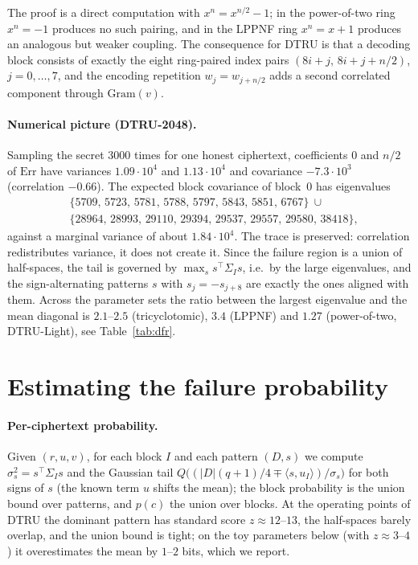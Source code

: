 \documentclass[11pt,a4paper]{article}
\theoremstyle{definition}
\theoremstyle{remark}
\newcommand{\Err}{\mathrm{Err}}
\newcommand{\Gram}{\mathrm{Gram}}
\begin{document}
The proof is a direct computation with $x^n=x^{n/2}-1$; in the power-of-two
ring $x^n=-1$ produces no such pairing, and in the LPPNF ring $x^n=x+1$
produces an analogous but weaker coupling. The consequence for DTRU is that
a decoding block consists of exactly the eight ring-paired index pairs
$(8i+j,\,8i+j+n/2)$, $j=0,\dots,7$, and the encoding repetition
$w_j=w_{j+n/2}$ adds a second correlated component through
$\Gram(v)$.

\paragraph{Numerical picture (DTRU-2048).}
Sampling the secret 3000 times for one honest ciphertext, coefficients $0$
and $n/2$ of $\Err$ have variances $1.09\cdot10^4$ and $1.13\cdot10^4$ and
covariance $-7.3\cdot10^3$ (correlation $-0.66$). The expected block
covariance of block~0 has eigenvalues
\begin{align*}
&\{5709,\,5723,\,5781,\,5788,\,5797,\,5843,\,5851,\,6767\}\ \cup\\
&\{28964,\,28993,\,29110,\,29394,\,29537,\,29557,\,29580,\,38418\},
\end{align*}
against a marginal variance of about $1.84\cdot10^4$. The trace is
preserved: correlation redistributes variance, it does not create it.
Since the failure region is a union of half-spaces, the tail is governed by
$\max_s s^\top\Sigma_I s$, i.e.\ by the large eigenvalues, and the
sign-alternating patterns $s$ with $s_j=-s_{j+8}$ are exactly the ones
aligned with them. Across the parameter sets the ratio between the largest
eigenvalue and the mean diagonal is $2.1$--$2.5$ (tricyclotomic), $3.4$
(LPPNF) and $1.27$ (power-of-two, DTRU-Light), see Table~\ref{tab:dfr}.

\section{Estimating the failure probability}
\label{sec:model}

\paragraph{Per-ciphertext probability.}
Given $(r,u,v)$, for each block $I$ and each pattern $(D,s)$ we compute
$\sigma_{s}^2=s^\top\Sigma_I s$ and the Gaussian tail
$Q\bigl((|D|(q+1)/4\mp\langle s,u_I\rangle)/\sigma_s\bigr)$ for both signs
of $s$ (the known term $u$ shifts the mean); the block probability is the
union bound over patterns, and $p(c)$ the union over blocks. At the
operating points of DTRU the dominant pattern has standard score
$z\approx 12$--$13$, the half-spaces barely overlap, and the union bound is
tight; on the toy parameters below (with $z\approx3$--$4$) it overestimates
the mean by $1$--$2$ bits, which we report.
\end{document}
